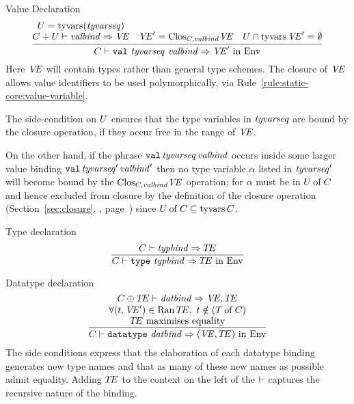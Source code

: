 \begin{sml-rule}{Value Declaration}
\begin{equation}\label{rule:static-core:value-declaration}
  \vcenter{\infer{\C\ts\boxml{val}\ \tyvarseq\ \valbind\ra\VE'\ \In\ \Env}
    {\deduce{\plusmap{\C}{\U}\ts\valbind\ra\VE}{U = \TyVarsFcn (\tyvarseq)}
      & \VE'=\cl{\C,\valbind}{\VE}
      & \U\cap\TyVarFcn\VE'=\emptyset}}
\end{equation}
Here $\textit{V\kern-.05emE\/}$ will contain types rather than general type schemes. The
closure of $\textit{V\kern-.05emE\/}$ allows value identifiers to be used polymorphically,
via Rule~\eqref{rule:static-core:value-variable}.

The side-condition on $U$ ensures that the type variables in
$\textit{tyvarseq\/}$ are bound by the closure operation, if they occur free in
the range of $\textit{V\kern-.05emE\/}$.

On the other hand,
if the phrase $\hbox{\tt val}\,\textit{tyvarseq\/}\,\textit{valbind\/}$ occurs inside
some larger value binding $\hbox{\tt val}\,\textit{tyvarseq\/}'\,\textit{valbind\/}'$
then no type variable $\alpha$ listed in $\textit{tyvarseq\/}'$ will become
bound by the ${\rm Clos}_{C,\textit{valbind\/}}\textit{V\kern-.05emE\/}$ operation; for $\alpha$ must 
be in $U \mathbin{\rm of} C$ and hence excluded from closure by the definition of the closure operation
(Section~\ref{sec:closure}, , page~\pageref{defn:closing-value-environment})
since $U \mathbin{\rm of} C\subseteq\mathop{\rm tyvars}\nolimits C$.
\end{sml-rule}

\begin{sml-rule}{Type declaration}
\begin{equation}\label{rule:static-core:type-declaration}
\vcenter{\infer{\C\ts\typedec\ra\TE\ \In\ \Env}{\C\ts\typbind\ra\TE}}
\end{equation}
\end{sml-rule}

\begin{sml-rule}{Datatype declaration}
\begin{equation}\label{rule:static-core:datatype-declaration}
  \vcenter{\infer{\C\ts\datatypedec\ra(\VE,\TE)\ \In\ \Env}
    {\deduce{\mbox{$\TE$ maximises equality}}
      {\deduce{\forall(\t,\VE')\in\Ran\TE,\ \t\notin(\of{\T}{\C})}
        {\C\oplus\TE\ts\datbind\ra\VE,\TE}}}}
\end{equation}
The side conditions express that the elaboration of each datatype
binding generates new type names and that as many of these new names as
possible admit equality.  Adding $\mbox{$T\!E$}$ to the context on the left of the
$\vdash$ captures the recursive nature of the binding.
\end{sml-rule}

